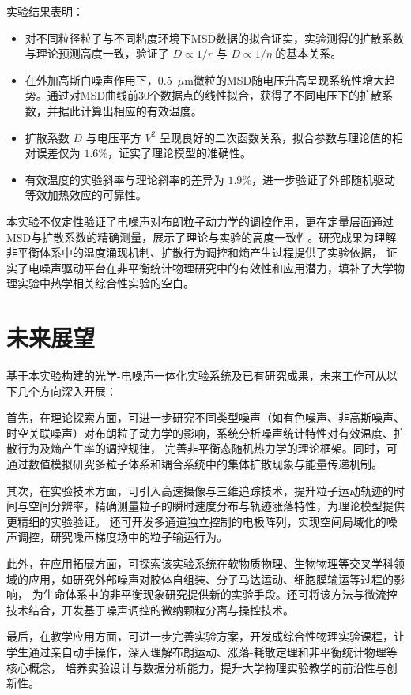 \documentclass[a4paper]{report} %
\begin{document}
实验结果表明：
\begin{itemize}
    \item 对不同粒径粒子与不同粘度环境下MSD数据的拟合证实，实验测得的扩散系数与理论预测高度一致，验证了 $D \propto 1/r$ 与 $D \propto 1/\eta$ 的基本关系。
    \item 在外加高斯白噪声作用下，0.5~$\mu$m微粒的MSD随电压升高呈现系统性增大趋势。通过对MSD曲线前30个数据点的线性拟合，获得了不同电压下的扩散系数，并据此计算出相应的有效温度。
    \item 扩散系数 $D$ 与电压平方 $V^2$ 呈现良好的二次函数关系，拟合参数与理论值的相对误差仅为 $1.6\%$，证实了理论模型的准确性。
    \item 有效温度的实验斜率与理论斜率的差异为 $1.9\%$，进一步验证了外部随机驱动等效加热效应的可靠性。
\end{itemize}

本实验不仅定性验证了电噪声对布朗粒子动力学的调控作用，更在定量层面通过MSD与扩散系数的精确测量，展示了理论与实验的高度一致性。研究成果为理解非平衡体系中的温度涌现机制、扩散行为调控和熵产生过程提供了实验依据，
证实了电噪声驱动平台在非平衡统计物理研究中的有效性和应用潜力，填补了大学物理实验中热学相关综合性实验的空白。

\section{未来展望}
基于本实验构建的光学-电噪声一体化实验系统及已有研究成果，未来工作可从以下几个方向深入开展：

首先，在理论探索方面，可进一步研究不同类型噪声（如有色噪声、非高斯噪声、时空关联噪声）对布朗粒子动力学的影响，系统分析噪声统计特性对有效温度、扩散行为及熵产生率的调控规律，
完善非平衡态随机热力学的理论框架。同时，可通过数值模拟研究多粒子体系和耦合系统中的集体扩散现象与能量传递机制。

其次，在实验技术方面，可引入高速摄像与三维追踪技术，提升粒子运动轨迹的时间与空间分辨率，精确测量粒子的瞬时速度分布与轨迹涨落特性，为理论模型提供更精细的实验验证。
还可开发多通道独立控制的电极阵列，实现空间局域化的噪声调控，研究噪声梯度场中的粒子输运行为。

此外，在应用拓展方面，可探索该实验系统在软物质物理、生物物理等交叉学科领域的应用，如研究外部噪声对胶体自组装、分子马达运动、细胞膜输运等过程的影响，
为生命体系中的非平衡现象研究提供新的实验手段。还可将该方法与微流控技术结合，开发基于噪声调控的微纳颗粒分离与操控技术。

最后，在教学应用方面，可进一步完善实验方案，开发成综合性物理实验课程，让学生通过亲自动手操作，深入理解布朗运动、涨落-耗散定理和非平衡统计物理等核心概念，
培养实验设计与数据分析能力，提升大学物理实验教学的前沿性与创新性。
\end{document}
